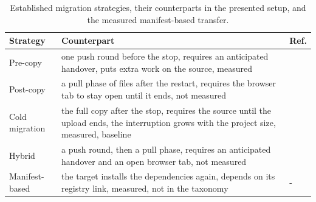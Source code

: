 \begin{table}[t]
\caption{Established migration strategies, their counterparts in the presented setup, and the measured manifest-based transfer.}
\label{tab:rq1}
\centering
\begin{tabular}{@{}p{}p{}p{}@{}}
\hline
\textbf{Strategy} & \textbf{Counterpart} & \textbf{Ref.} \\
\hline
Pre-copy & one push round before the stop, requires an anticipated handover, puts extra work on the source, measured & \cite{clark2005live} \\
Post-copy & a pull phase of files after the restart, requires the browser tab to stay open until it ends, not measured & \cite{hines2009post} \\
Cold migration & the full copy after the stop, requires the source until the upload ends, the interruption grows with the project size, measured, baseline & \cite{clark2005live,he2023taxonomy} \\
Hybrid & a push round, then a pull phase, requires an anticipated handover and an open browser tab, not measured & \cite{he2023taxonomy} \\
Manifest-based & the target installs the dependencies again, depends on its registry link, measured, not in the taxonomy \cite{he2023taxonomy} & - \\
\hline
\end{tabular}
\end{table}
